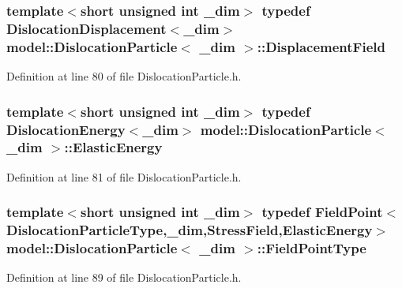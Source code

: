 \subsubsection[{Displacement\+Field}]{\setlength{\rightskip}{0pt plus 5cm}template$<$short unsigned int \+\_\+dim$>$ typedef {\bf Dislocation\+Displacement}$<$\+\_\+dim$>$ {\bf model\+::\+Dislocation\+Particle}$<$ \+\_\+dim $>$\+::{\bf Displacement\+Field}}\label{structmodel_1_1_dislocation_particle_a3c35f30e393557a4bcb372f270403c31}


Definition at line 80 of file Dislocation\+Particle.\+h.

\hypertarget{structmodel_1_1_dislocation_particle_acb452e4510d2079aa300effcf6829e6f}{}
\subsubsection[{Elastic\+Energy}]{\setlength{\rightskip}{0pt plus 5cm}template$<$short unsigned int \+\_\+dim$>$ typedef {\bf Dislocation\+Energy}$<$\+\_\+dim$>$ {\bf model\+::\+Dislocation\+Particle}$<$ \+\_\+dim $>$\+::{\bf Elastic\+Energy}}\label{structmodel_1_1_dislocation_particle_acb452e4510d2079aa300effcf6829e6f}


Definition at line 81 of file Dislocation\+Particle.\+h.

\hypertarget{structmodel_1_1_dislocation_particle_a89a31e2be848e9b3d236eaf3334ffe49}{}
\subsubsection[{Field\+Point\+Type}]{\setlength{\rightskip}{0pt plus 5cm}template$<$short unsigned int \+\_\+dim$>$ typedef {\bf Field\+Point}$<${\bf Dislocation\+Particle\+Type},\+\_\+dim,{\bf Stress\+Field},{\bf Elastic\+Energy}$>$ {\bf model\+::\+Dislocation\+Particle}$<$ \+\_\+dim $>$\+::{\bf Field\+Point\+Type}}\label{structmodel_1_1_dislocation_particle_a89a31e2be848e9b3d236eaf3334ffe49}


Definition at line 89 of file Dislocation\+Particle.\+h.

\hypertarget{structmodel_1_1_dislocation_particle_a4fb98d6dbd350e248452f5bbcb3078f3}{}
